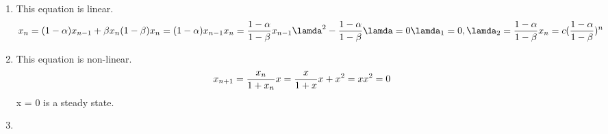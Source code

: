 
\begin{homeworkProblem}[1]
\begin{enumerate}
    \item This equation is linear.
    \[
        x_n = (1-\alpha) x_{n-1} + \beta x_n \\
        (1 - \beta) x_n = (1 - \alpha) x_{n-1} \\
        x_n = \frac{1 - \alpha}{1 - \beta} x_{n-1} \\
        \lamda^2 - \frac{1 - \alpha}{1 - \beta} \lamda = 0 \\
        \lamda_1 = 0, \lamda_2 = \frac{1 - \alpha}{1 - \beta} \\
        x_n = c(\frac{1 - \alpha}{1 - \beta})^n \\
        \]

    \item This equation is non-linear.
    \[
        x_{n+1} = \frac{x_n}{1 + x_n} \\
        x = \frac{x}{1 + x}  \\
        x + x^2 = x \\
        x^2 = 0 \\
    \]
    x = 0 is a steady state.

    \item
\end{enumerate}
\end{homeworkProblem}